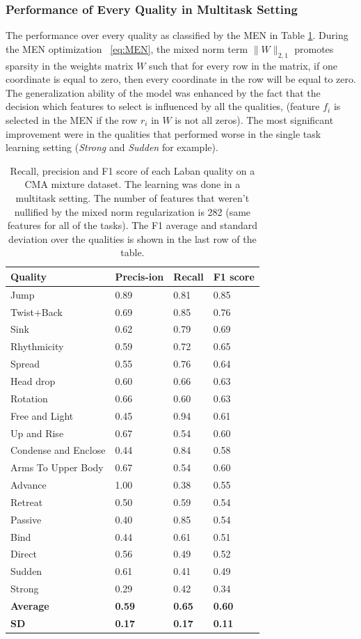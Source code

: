 \documentclass[11pt,twocolumn,varwidth=true,a4paper,fleqn]{article}
\begin{document}
\subsubsection{Performance of Every Quality in Multitask Setting}
The performance over every quality as classified by the MEN in Table
\ref{mixedSummary}. During the MEN optimization ~\eqref{eq:MEN}, the mixed norm 
term $\|W\|_{2,1}$  promotes sparsity in the weights matrix $W$ such that for 
every row in the matrix, if one coordinate is equal to zero, then every coordinate 
in the row will be equal to zero.
\\The generalization ability of the model was enhanced by the fact that the
decision which features to select is influenced by all the qualities, (feature $f_i$ is 
selected in the MEN if the row $r_i$ in $W$ is not all zeros). The most
significant improvement were in the qualities that performed worse in the
single task learning setting (\textit{Strong} and \textit{Sudden} for example).
\begin{table}[!h]
	  	\centering
		\begin{tabular}{|p{3cm}|p{0.9cm}|p{0.9cm}|p{0.9cm}|}
		\hline
		Quality&Precis-ion&Recall&F1 score\\\hline
		Jump&0.89&0.81&0.85\\\hline
		Twist+Back&0.69&0.85&0.76\\\hline
		Sink&0.62&0.79&0.69\\\hline
		Rhythmicity&0.59&0.72&0.65\\\hline
		Spread&0.55&0.76&0.64\\\hline
		Head drop&0.60&0.66&0.63\\\hline
		Rotation&0.66&0.60&0.63\\\hline
		Free and Light&0.45&0.94&0.61\\\hline
		Up and Rise&0.67&0.54&0.60\\\hline
		Condense and Enclose&0.44&0.84&0.58\\\hline
		Arms To Upper Body&0.67&0.54&0.60\\\hline
		Advance&1.00&0.38&0.55\\\hline
		Retreat&0.50&0.59&0.54\\\hline
		Passive&0.40&0.85&0.54\\\hline
		Bind&0.44&0.61&0.51\\\hline
		Direct&0.56&0.49&0.52\\\hline
		Sudden&0.61&0.41&0.49\\\hline
		Strong&0.29&0.42&0.34\\\hline
		\textbf{Average}&\textbf{0.59}&\textbf{0.65}&\textbf{0.60}\\\hline
		\textbf{SD}&\textbf{0.17}&\textbf{0.17}&\textbf{0.11}\\\hline
		\end{tabular}
		\caption{Recall, precision and F1 score of each Laban quality on a CMA
		   mixture dataset. The learning was done in a multitask setting. The number of
		   features that weren't nullified by the mixed norm regularization is
		   282 (same features for all of the tasks). The F1 average and standard
		   deviation over the qualities is shown in the last row of the table.}
	   \label{mixedSummary}
	\end{table}
\end{document}

